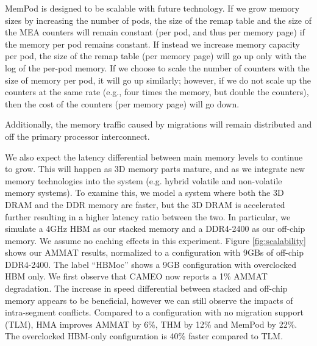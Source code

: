 MemPod is designed to be scalable with future technology.  If we grow memory
sizes by increasing the number of pods, the size of the remap table and the 
size of the MEA counters will remain constant (per pod, and thus per memory
page) if the memory per pod remains constant.  If instead we increase
memory capacity per pod, the size of the remap table (per memory page)
will go up only with the log of the per-pod memory. If we choose to scale
the number of counters with the size of memory per pod, it will go up
similarly; however, if we do not scale up the counters at the same rate
(e.g., four times the memory, but double the counters), then the cost
of the counters (per memory page) will go down.

Additionally, the memory traffic caused by migrations will remain distributed
and off the primary processor interconnect.

We also expect the latency differential between main memory levels to 
continue to grow.  This will happen as 3D memory parts mature, and as
we integrate new memory technologies into the system (e.g. hybrid
volatile and non-volatile memory systems).
To examine this, we model a system where both the 3D DRAM and the DDR memory
are faster, but the 3D DRAM is accelerated further resulting in a higher
latency ratio between the two. 
In particular, we simulate a 4GHz HBM as our stacked memory and a DDR4-2400 as our off-chip memory. 
We assume no caching effects in this experiment.
Figure \ref{fig:scalability} shows our AMMAT results, normalized to a configuration with 9GBs of off-chip DDR4-2400. The label ``HBMoc'' shows a 9GB configuration with overclocked HBM only. We first observe that CAMEO now reports a 1\% AMMAT degradation. The increase in speed differential between stacked and off-chip memory appears to be beneficial, however we can still observe the impacts of intra-segment conflicts. Compared to a configuration with no migration support (TLM), HMA improves AMMAT by 6\%, THM by 12\% and MemPod by 22\%. The overclocked HBM-only configuration is 40\% faster compared to TLM.


